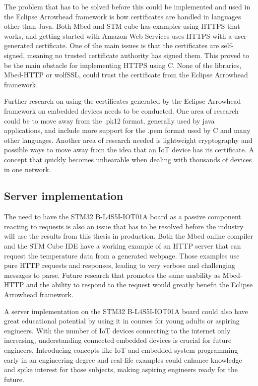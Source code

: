 The problem that has to be solved before this could be implemented and used in the Eclipse Arrowhead framework is how certificates are handled in languages other than Java.
Both Mbed and STM cube has examples using HTTPS that works, and getting started with Amazon Web Services uses HTTPS with a user-generated certificate.
One of the main issues is that the certificates are self-signed, meaning no trusted certificate authority has signed them. 
This proved to be the main obstacle for implementing HTTPS using C. None of the libraries, Mbed-HTTP or wolfSSL, could trust the certificate from the Eclipse Arrowhead framework.

Further research on using the certificates generated by the Eclipse Arrowhead framework on embedded devices needs to be conducted.
One area of research could be to move away from the .pk12 format, generally used by java applications, and include more support for the .pem format used by C and many other languages.
Another area of research needed is lightweight cryptography and possible ways to move away from the idea that an IoT device has its certificate.
A concept that quickly becomes unbearable when dealing with thousands of devices in one network.

\subsection{Server implementation}
The need to have the STM32 B-L4S5I-IOT01A board as a passive component reacting to requests is also an issue that has to be resolved before the industry will use the results from this thesis in production.
Both the Mbed online compiler and the STM Cube IDE have a working example of an HTTP server that can request the temperature data from a generated webpage.
Those examples use pure HTTP requests and responses, leading to very verbose and challenging messages to parse. 
Future research that promotes the same usability as Mbed-HTTP and the ability to respond to the request would greatly benefit the Eclipse Arrowhead framework.  

A server implementation on the STM32 B-L4S5I-IOT01A board could also have great educational potential by using it in courses for young adults or aspiring engineers.
With the number of IoT devices connecting to the internet only increasing, understanding connected embedded devices is crucial for future engineers. 
Introducing concepts like IoT and embedded system programming early in an engineering degree and real-life examples could enhance knowledge and spike interest for those subjects, making aspiring engineers ready for the future.  
